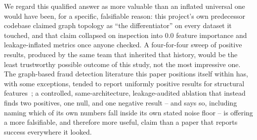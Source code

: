 We regard this qualified answer as more valuable than an inflated universal
one would have been, for a specific, falsifiable reason: this project's own
predecessor codebase claimed graph topology as ``the differentiator'' on
every dataset it touched, and that claim collapsed on inspection into $0.0$
feature importance and leakage-inflated metrics once anyone checked. A
four-for-four sweep of positive results, produced by the same team that
inherited that history, would be the least trustworthy possible outcome of
this study, not the most impressive one. The graph-based fraud detection
literature this paper positions itself within has, with some exceptions,
tended to report uniformly positive results for structural
features~\cite{motie2024gnn,yuan2025survey}; a controlled, same-architecture,
leakage-audited ablation that instead finds two positives, one null, and one
negative result -- and says so, including naming which of its own numbers
fall inside its own stated noise floor -- is offering a more falsifiable, and
therefore more useful, claim than a paper that reports success everywhere it
looked.

